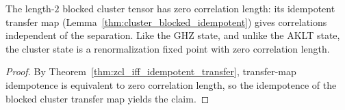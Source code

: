\begin{lemma}\label{thm:cluster_zcl}
    \leanok
    The length-$2$ blocked cluster tensor has zero correlation length: its
    idempotent transfer map (Lemma~\ref{thm:cluster_blocked_idempotent}) gives
    correlations independent of the separation. Like the GHZ state, and unlike
    the AKLT state, the cluster state is a renormalization fixed point with zero
    correlation length.
\end{lemma}

\begin{proof}
    \leanok
    By Theorem~\ref{thm:zcl_iff_idempotent_transfer}, transfer-map idempotence
    is equivalent to zero correlation length, so the idempotence of the blocked
    cluster transfer map yields the claim.
\end{proof}

